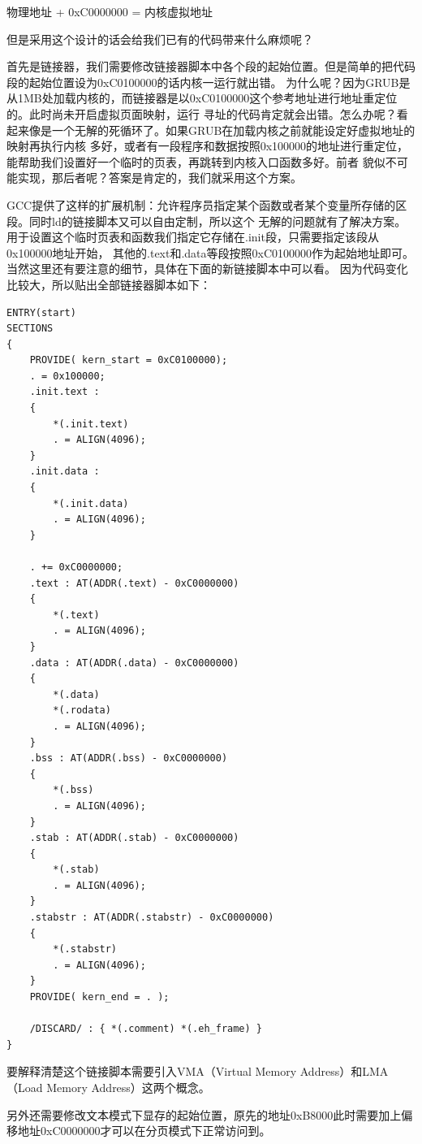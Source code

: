 \par 物理地址 + 0xC0000000 = 内核虚拟地址

\par 但是采用这个设计的话会给我们已有的代码带来什么麻烦呢？

\par 首先是链接器，我们需要修改链接器脚本中各个段的起始位置。但是简单的把代码段的起始位置设为0xC0100000的话内核一运行就出错。\allowbreak
为什么呢？因为GRUB是从1MB处加载内核的，而链接器是以0xC0100000这个参考地址进行地址重定位的。此时尚未开启虚拟页面映射，运行\allowbreak
寻址的代码肯定就会出错。怎么办呢？看起来像是一个无解的死循环了。如果GRUB在加载内核之前就能设定好虚拟地址的映射再执行内核\allowbreak
多好，或者有一段程序和数据按照0x100000的地址进行重定位，能帮助我们设置好一个临时的页表，再跳转到内核入口函数多好。前者\allowbreak
貌似不可能实现，那后者呢？答案是肯定的，我们就采用这个方案。

\par GCC提供了这样的扩展机制：允许程序员指定某个函数或者某个变量所存储的区段。同时ld的链接脚本又可以自由定制，所以这个\allowbreak
无解的问题就有了解决方案。用于设置这个临时页表和函数我们指定它存储在.init段，只需要指定该段从0x100000地址开始，\allowbreak
其他的.text和.data等段按照0xC0100000作为起始地址即可。当然这里还有要注意的细节，具体在下面的新链接脚本中可以看。\allowbreak
因为代码变化比较大，所以贴出全部链接器脚本如下：

\begin{lstlisting}[caption = script/kernel.ld]
ENTRY(start)
SECTIONS
{
	PROVIDE( kern_start = 0xC0100000);
	. = 0x100000; 
	.init.text : 
	{
		*(.init.text)
		. = ALIGN(4096);
	}
	.init.data : 
	{
		*(.init.data)
		. = ALIGN(4096);
	}

	. += 0xC0000000;
	.text : AT(ADDR(.text) - 0xC0000000)
	{
		*(.text)
		. = ALIGN(4096);
	}
	.data : AT(ADDR(.data) - 0xC0000000)
	{
		*(.data)
		*(.rodata)
		. = ALIGN(4096);
	}
	.bss : AT(ADDR(.bss) - 0xC0000000)
	{
		*(.bss)
		. = ALIGN(4096);
	}
	.stab : AT(ADDR(.stab) - 0xC0000000)
	{
		*(.stab)
		. = ALIGN(4096);
	}
	.stabstr : AT(ADDR(.stabstr) - 0xC0000000)
	{
		*(.stabstr)
	 	. = ALIGN(4096);
	}
	PROVIDE( kern_end = . );
	
	/DISCARD/ : { *(.comment) *(.eh_frame) }
}
\end{lstlisting}

\par 要解释清楚这个链接脚本需要引入VMA（Virtual Memory Address）和LMA（Load Memory Address）这两个概念。



\par 另外还需要修改文本模式下显存的起始位置，原先的地址0xB8000此时需要加上偏移地址0xC0000000才可以在分页模式下正常访问到。
